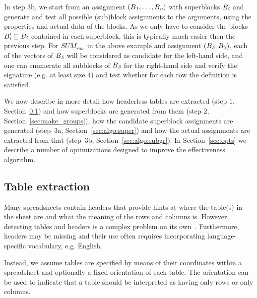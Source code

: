 In step 3b, we start from an assignment $(B_{\textit{1}}, \ldots, B_{\textit{n}})$ with superblocks $B_{\textit{i}}$ and generate and test all possible (sub)block assignments to the arguments, using the properties and actual data of the blocks. As we only have to consider the blocks $B'_{\textit{i}} \sqsubseteq B_{\textit{i}}$ contained in each superblock, this is typically much easier then the previous step. For $\textit{SUM}_{row}$ in the above example and assignment $(B_{\textit{5}}, B_{\textit{3}})$, each of the vectors of $B_{\textit{5}}$ will be considered as candidate for the left-hand side, and one can enumerate all subblocks of $B_{\textit{3}}$ for the right-hand side and verify the signature (e.g. at least size $4$) and test whether for each row the definition is satisfied. %

We now describe in more detail how headerless tables are extracted (step 1, Section~\ref{sec:table_extraction}) and how superblocks are generated from them (step 2, Section~\ref{sec:make_groups}), how the candidate superblock assignments are generated (step~3a, Section~\ref{sec:algo:super}) and how the actual assignments are extracted from that (step~3b, Section~\ref{sec:algo:subgr}).
In Section~\ref{sec:opts} we describe a number of optimizations designed to improve the effectiveness algorithm.





\subsection{Table extraction}
\label{sec:table_extraction}
Many spreadsheets contain headers that provide hints at where the table(s) in the sheet are and what the meaning of the rows and columns is. However, detecting tables and headers is a complex problem on its own~\cite{header}. Furthermore, headers may be missing and their use often requires incorporating language-specific vocabulary, e.g. English.


Instead, we assume tables are specified by means of their coordinates within a spreadsheet and optionally a fixed orientation of each table. The orientation can be used to indicate that a table should be interpreted as having only rows or only columns.

